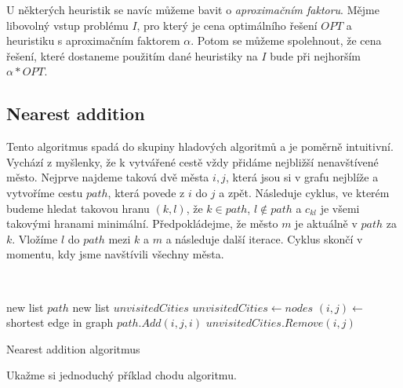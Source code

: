 \documentclass[
  biblatex,
  figures=false,
  glossaries,
  index
]{kidiplom}
\begin{document}
U některých heuristik se navíc můžeme bavit o \textit{aproximačním faktoru}. Mějme libovolný vstup problému $I$, pro který je cena optimálního řešení $OPT$ a heuristiku s aproximačním faktorem $\alpha$. Potom se můžeme spolehnout, že cena řešení, které dostaneme použitím dané heuristiky na $I$ bude při nejhorším $\alpha * OPT$.

\subsection{Nearest addition}
	Tento algoritmus spadá do skupiny hladových algoritmů a je poměrně intuitivní. Vychází z myšlenky, že k vytvářené cestě vždy přidáme nejbližší nenavštívené město. Nejprve najdeme taková dvě města $i, j$, která jsou si v grafu nejblíže a vytvoříme cestu $path$, která povede z $i$ do $j$ a zpět. Následuje cyklus, ve kterém budeme hledat takovou hranu $(k, l)$, že $k \in path$, $l \notin path$ a $c_{kl}$ je všemi takovými hranami minimální. Předpokládejme, že město $m$ je aktuálně v $path$ za $k$. Vložíme $l$ do $path$ mezi $k$ a $m$ a následuje další iterace. Cyklus skončí v momentu, kdy jsme navštívili všechny města.\newline
	
{\SetAlgoNoLine\
\begin{algorithm}[H]
new list $path$\;
new list $unvisitedCities$\;
$unvisitedCities \leftarrow nodes$\;
$(i, j) \leftarrow $ shortest edge in graph\;
$path.Add(i, j, i)$\;
$unvisitedCities.Remove(i, j)$\;

\caption{Nearest addition algoritmus}
\end{algorithm}}\leavevmode\newline

Ukažme si jednoduchý příklad chodu algoritmu.
\end{document}
